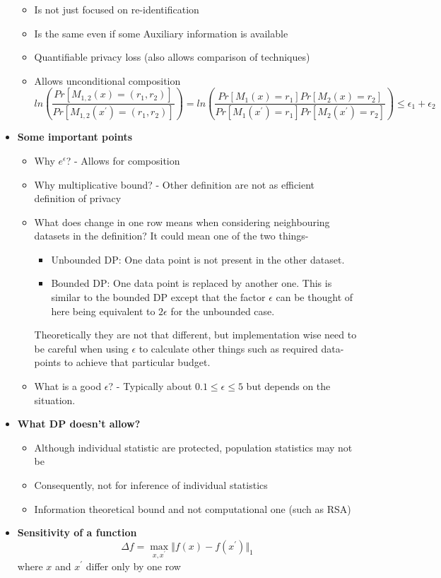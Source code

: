 \documentclass{article}
\begin{document}
\begin{itemize}
\begin{itemize}
            \item Is not just focused on re-identification
            \item Is the same even if some Auxiliary information is available
            \item Quantifiable privacy loss (also allows comparison of techniques)
            \item Allows unconditional composition
                $$ln\left( \frac{Pr[M_{1,2}(x) = (r_1, r_2)]}{Pr[M_{1,2}(x^\prime) = (r_1, r_2)]} \right) = ln\left( \frac{Pr[M_1(x) = r_1]Pr[M_2(x) = r_2]}{Pr[M_1(x^\prime) = r_1]Pr[M_2(x^\prime) = r_2]} \right) \leq \epsilon_1+\epsilon_2$$
        \end{itemize}
    \item \textbf{Some important points}
    \begin{itemize}
        \item Why $e^\epsilon$? - Allows for composition
        \item Why multiplicative bound? - Other definition are not as efficient definition of privacy 
        \item What does change in one row means when considering neighbouring datasets in the definition? It could mean one of the two things-
            \begin{itemize}
                \item Unbounded DP: One data point is not present in the other dataset.
                \item Bounded DP: One data point is replaced by another one. This is similar to the bounded DP except that the factor $\epsilon$ can be thought of here being equivalent to $2\epsilon$ for the unbounded case.
            \end{itemize}
            Theoretically they are not that different, but implementation wise need to be careful when using $\epsilon$ to calculate other things such as required data-points to achieve that particular budget.
        \item What is a good $\epsilon$? - Typically about $0.1 \leq \epsilon \leq 5$ but depends on the situation.
    \end{itemize}
    \item \textbf{What DP doesn't allow?}
        \begin{itemize}
            \item Although individual statistic are protected, population statistics may not be
            \item Consequently, not for inference of individual statistics
            \item Information theoretical bound and not computational one (such as RSA)
        \end{itemize}
    \item \textbf{Sensitivity of a function}
        $$\Delta f = \max_{x, x^\prime} \Vert f(x)-f(x^\prime) \Vert_1$$
        where $x$ and $x^\prime$ differ only by one row
\end{itemize}
\end{document}
